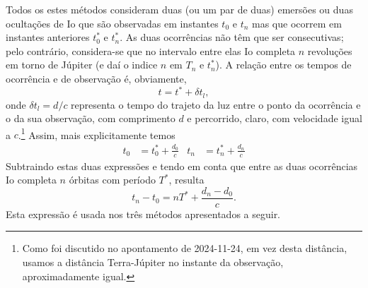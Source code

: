 \documentclass[]{article}
\begin{document}
Todos os estes métodos consideram duas (ou um par de duas) emersões ou duas
ocultações de Io que são observadas em instantes $t_0$ e $t_n$ mas que ocorrem
em instantes anteriores $t^*_0$ e $t^*_n$. As duas ocorrências não têm que ser
consecutivas; pelo contrário, considera-se que no intervalo entre elas Io
completa $n$ revoluções em torno de Júpiter (e daí o indice $n$ em $T_n$ e
$t^*_n$). A relação entre os tempos de ocorrência e de observação é, obviamente,
\begin{equation*}
  t=t^*+\delta t_l,
\end{equation*}
onde $\delta t_l=d/c$ representa o tempo do trajeto da luz entre o ponto da
ocorrência e o da sua observação, com comprimento $d$ e percorrido, claro, com
velocidade igual a $c$.\footnote{Como foi discutido no apontamento de 2024-11-24, em vez
desta distância, usamos a distância Terra-Júpiter no instante da observação,
aproximadamente igual.}
Assim, mais explicitamente temos
\begin{align*}
  t_0&=t^*_0+\frac{d_0}{c}& t_n&=t^*_n+\frac{d_n}{c}
\end{align*}
Subtraindo estas duas expressões e tendo em conta que entre as duas ocorrências
Io completa $n$ órbitas com período $T^*$, resulta
\begin{equation}\label{eq:a}
  t_n-t_0=nT^*+\frac{d_n-d_0}{c}.
\end{equation}
Esta expressão é usada nos três métodos apresentados a seguir.
\end{document}
